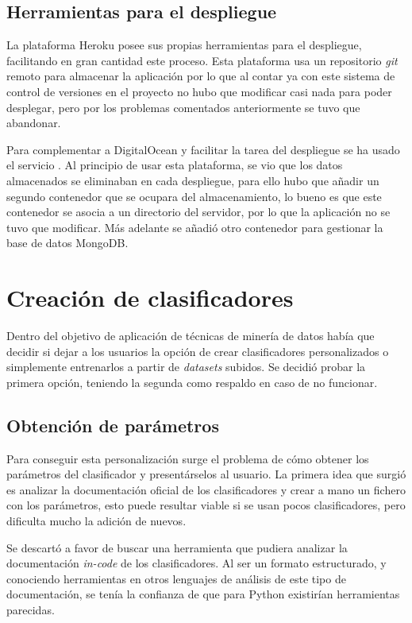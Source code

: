 \subsection{Herramientas para el despliegue}

La plataforma Heroku posee sus propias herramientas para el despliegue,
facilitando en gran cantidad este proceso. Esta plataforma usa un repositorio
\textit{git} remoto para almacenar la aplicación por lo que al contar ya con
este sistema de control de versiones en el proyecto no hubo que modificar casi
nada para poder desplegar, pero por los problemas comentados anteriormente se
tuvo que abandonar.

Para complementar a DigitalOcean y facilitar la tarea del despliegue se ha usado
el servicio . Al principio de usar
esta plataforma, se vio que los datos almacenados se eliminaban en cada
despliegue, para ello hubo que añadir un segundo contenedor que se ocupara del
almacenamiento, lo bueno es que este contenedor se asocia a un directorio del
servidor, por lo que la aplicación no se tuvo que modificar. Más adelante se
añadió otro contenedor para gestionar la base de datos MongoDB.

\section{Creación de clasificadores}

Dentro del objetivo de aplicación de técnicas de minería de datos había que
decidir si dejar a los usuarios la opción de crear clasificadores personalizados
o simplemente entrenarlos a partir de \textit{datasets} subidos. Se decidió
probar la primera opción, teniendo la segunda como respaldo en caso de no
funcionar.

\subsection{Obtención de parámetros}

Para conseguir esta personalización surge el problema de cómo obtener los
parámetros del clasificador y presentárselos al usuario. La primera idea que
surgió es analizar la documentación oficial de los clasificadores y crear a mano
un fichero con los parámetros, esto puede resultar viable si se usan pocos
clasificadores, pero dificulta mucho la adición de nuevos.

Se descartó a favor de buscar una herramienta que pudiera analizar la
documentación \textit{in-code} de los clasificadores. Al ser un formato
estructurado, y conociendo herramientas en otros lenguajes de análisis de este
tipo de documentación, se tenía la confianza de que para Python existirían
herramientas parecidas.

